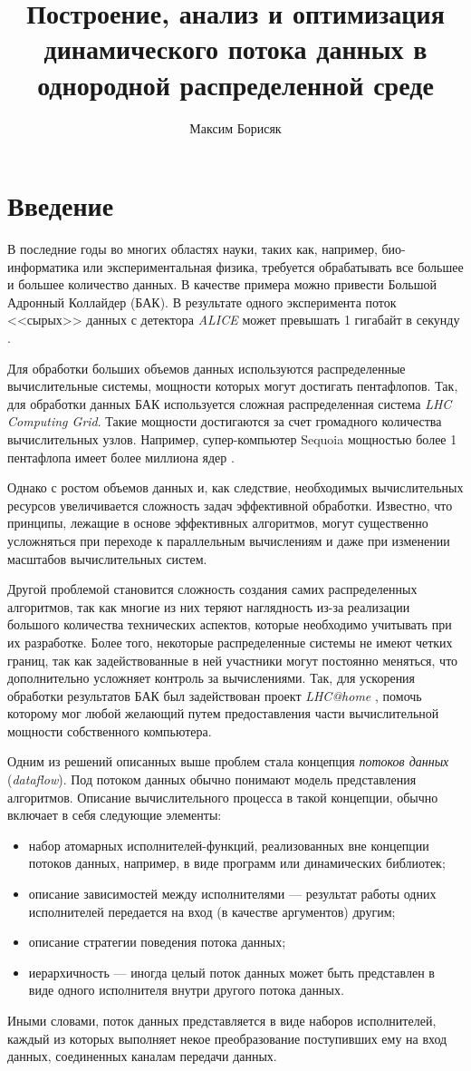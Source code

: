 \documentclass[10pt,a4paper]{article}
\author{Максим Борисяк}
\title{Построение, анализ и оптимизация динамического потока данных в однородной распределенной среде}
\begin{document}
\section{Введение}
В последние годы во многих областях науки, таких как, например, био-информатика или экспериментальная физика,
требуется обрабатывать все большее и большее количество данных.
В качестве примера можно привести Большой Адронный Коллайдер (БАК). 
В результате одного эксперимента поток <<сырых>> данных с детектора \textit{ALICE} может превышать 1 гигабайт в секунду \cite{lhc-manual}.

Для обработки больших объемов данных используются распределенные вычислительные системы, мощности которых могут достигать пентафлопов.
Так, для обработки данных БАК используется сложная распределенная система \textit{LHC Computing Grid}.
Такие мощности достигаются за счет громадного количества вычислительных узлов. Например, супер-компьютер Sequoia мощностью более 1 пентафлопа
имеет более миллиона ядер \cite{top500}.

Однако с ростом объемов данных и, как следствие, необходимых вычислительных ресурсов увеличивается сложность задач эффективной обработки.
Известно, что принципы, лежащие в основе эффективных алгоритмов, могут существенно усложняться при переходе к параллельным вычислениям
и даже при изменении масштабов вычислительных систем.

Другой проблемой становится сложность создания самих распределенных алгоритмов,
так как многие из них теряют наглядность из-за реализации большого количества технических аспектов, которые необходимо учитывать при их разработке.
Более того, некоторые распределенные системы не имеют четких границ, так как задействованные в ней участники могут постоянно меняться,
что дополнительно усложняет контроль за вычислениями.
Так, для ускорения обработки результатов БАК был задействован проект \textit{LHC@home} \cite{lhc-home}, помочь которому мог любой желающий путем предоставления части
вычислительной мощности собственного компьютера.

Одним из решений описанных выше проблем стала концепция \textit{потоков данных} (\textit{dataflow}).
Под потоком данных обычно понимают модель представления алгоритмов.
Описание вычислительного процесса в такой концепции, обычно включает в себя следующие элементы:
\begin{itemize}
  \item набор атомарных исполнителей-функций, реализованных вне концепции потоков данных, например, в виде программ или динамических библиотек;
  \item описание зависимостей между исполнителями --- результат работы одних исполнителей передается на вход (в качестве аргументов) другим;
  \item описание стратегии поведения потока данных;
  \item иерархичность --- иногда целый поток данных может быть представлен в виде одного исполнителя внутри другого потока данных.
\end{itemize}
Иными словами, поток данных представляется в виде наборов исполнителей, каждый из которых выполняет некое преобразование поступивших ему на вход данных,
соединенных каналам передачи данных.
\end{document}
